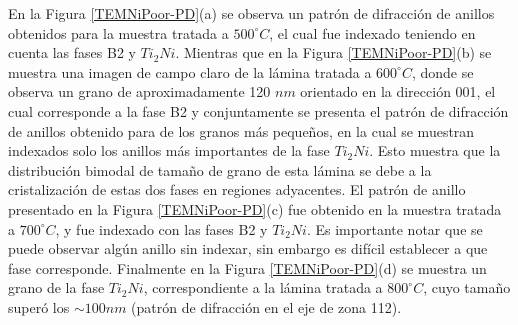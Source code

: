 \documentclass[12pt]{article}
\theoremstyle{definition}
\theoremstyle{remark}
\begin{document}
{En la Figura \ref{TEMNiPoor-PD}(a) se observa un patrón de difracción de anillos obtenidos para la muestra tratada a $500 ^\circ C$, el cual fue indexado teniendo en cuenta las fases B2 y $Ti_2Ni$. Mientras que en la Figura \ref{TEMNiPoor-PD}(b) se muestra una imagen de campo claro de la lámina tratada a $600 ^\circ C$, donde se observa un grano de aproximadamente 120 $nm$ orientado en la dirección 001, el cual corresponde a la fase B2 y conjuntamente se presenta el patrón de difracción de anillos obtenido para de los granos más pequeños, en la cual se muestran indexados solo los anillos más importantes de la fase $Ti_2 Ni$. Esto muestra que la distribución bimodal de tamaño de grano de esta lámina se debe a la cristalización de estas dos fases en regiones adyacentes. El patrón de anillo presentado en la Figura \ref{TEMNiPoor-PD}(c) fue obtenido en la muestra tratada a $700 ^\circ C$, y fue  indexado con las fases B2 y $Ti_2Ni$. Es importante notar que se puede observar algún anillo sin indexar, sin embargo es difícil establecer a que fase corresponde. Finalmente en la Figura \ref{TEMNiPoor-PD}(d) se muestra un grano de la fase $Ti_2Ni$, correspondiente a la lámina tratada a $800 ^\circ C$, cuyo tamaño superó los $\sim 100 nm$ (patrón de difracción en el eje de zona 112).

}
\end{document}
